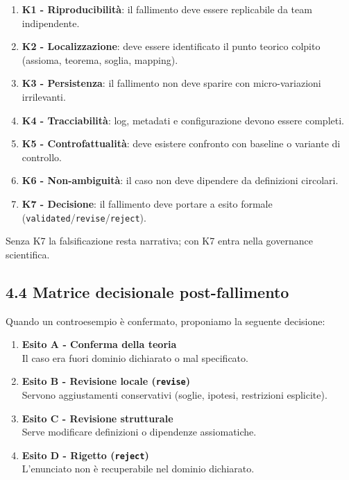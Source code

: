 \begin{enumerate}
\def\labelenumi{\arabic{enumi}.}
\tightlist
\item
  \textbf{K1 - Riproducibilità}: il fallimento deve essere replicabile da team indipendente.
\item
  \textbf{K2 - Localizzazione}: deve essere identificato il punto teorico colpito (assioma, teorema, soglia, mapping).
\item
  \textbf{K3 - Persistenza}: il fallimento non deve sparire con micro-variazioni irrilevanti.
\item
  \textbf{K4 - Tracciabilità}: log, metadati e configurazione devono essere completi.
\item
  \textbf{K5 - Controfattualità}: deve esistere confronto con baseline o variante di controllo.
\item
  \textbf{K6 - Non-ambiguità}: il caso non deve dipendere da definizioni circolari.
\item
  \textbf{K7 - Decisione}: il fallimento deve portare a esito formale (\texttt{validated}/\texttt{revise}/\texttt{reject}).
\end{enumerate}

Senza K7 la falsificazione resta narrativa; con K7 entra nella governance scientifica.

\subsection{4.4 Matrice decisionale post-fallimento}

Quando un controesempio è confermato, proponiamo la seguente decisione:

\begin{enumerate}
\def\labelenumi{\arabic{enumi}.}
\item
  \textbf{Esito A - Conferma della teoria}\\
  Il caso era fuori dominio dichiarato o mal specificato.
\item
  \textbf{Esito B - Revisione locale (\texttt{revise})}\\
  Servono aggiustamenti conservativi (soglie, ipotesi, restrizioni esplicite).
\item
  \textbf{Esito C - Revisione strutturale}\\
  Serve modificare definizioni o dipendenze assiomatiche.
\item
  \textbf{Esito D - Rigetto (\texttt{reject})}\\
  L'enunciato non è recuperabile nel dominio dichiarato.
\end{enumerate}


